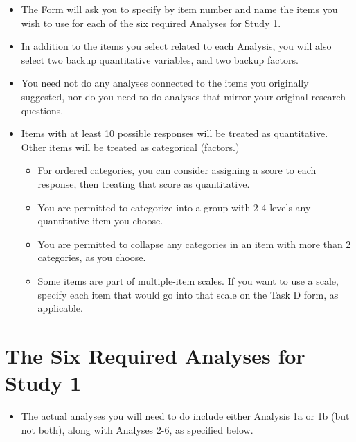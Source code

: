\documentclass[]{book}
\providecommand{\tightlist}{%
  \setlength{\itemsep}{0pt}\setlength{\parskip}{0pt}}
\theoremstyle{definition}
\theoremstyle{definition}
\theoremstyle{definition}
\theoremstyle{remark}
\begin{document}
\begin{itemize}
\tightlist
\item
  The Form will ask you to specify by item number and name the items you
  wish to use for each of the six required Analyses for Study 1.
\item
  In addition to the items you select related to each Analysis, you will
  also select two backup quantitative variables, and two backup factors.
\item
  You need not do any analyses connected to the items you originally
  suggested, nor do you need to do analyses that mirror your original
  research questions.
\item
  Items with at least 10 possible responses will be treated as
  quantitative. Other items will be treated as categorical (factors.)

  \begin{itemize}
  \tightlist
  \item
    For ordered categories, you can consider assigning a score to each
    response, then treating that score as quantitative.
  \item
    You are permitted to categorize into a group with 2-4 levels any
    quantitative item you choose.
  \item
    You are permitted to collapse any categories in an item with more
    than 2 categories, as you choose.
  \item
    Some items are part of multiple-item scales. If you want to use a
    scale, specify each item that would go into that scale on the Task D
    form, as applicable.
  \end{itemize}
\end{itemize}

\hypertarget{the-six-required-analyses-for-study-1}{%
\section{The Six Required Analyses for Study
1}\label{the-six-required-analyses-for-study-1}}

\begin{itemize}
\tightlist
\item
  The actual analyses you will need to do include either Analysis 1a or
  1b (but not both), along with Analyses 2-6, as specified below.
\end{itemize}
\end{document}
